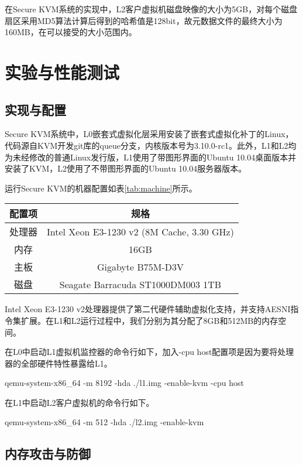 在Secure KVM系统的实现中，L2客户虚拟机磁盘映像的大小为5GB，对每个磁盘扇区采用MD5算法计算后得到的哈希值是128bit，故元数据文件的最终大小为160MB，在可以接受的大小范围内。

\section{实验与性能测试}

\subsection{实现与配置}

Secure KVM系统中，L0嵌套式虚拟化层采用安装了嵌套式虚拟化补丁的Linux，代码源自KVM开发git库的queue分支，内核版本号为3.10.0-rc1。此外，L1和L2均为未经修改的普通Linux发行版，L1使用了带图形界面的Ubuntu 10.04桌面版本并安装了KVM，L2使用了不带图形界面的Ubuntu 10.04服务器版本。

运行Secure KVM的机器配置如表\ref{tab:machine}所示。

\begin{table}[!htbp]
\centering
\begin{tabular}{cc}
\toprule
配置项	& 规格\\
\midrule
处理器	& Intel Xeon E3-1230 v2 (8M Cache, 3.30 GHz)\\
内存	& 16GB\\
主板	& Gigabyte B75M-D3V\\
磁盘  & Seagate Barracuda ST1000DM003 1TB\\
\bottomrule
\end{tabular}
\end{table}

Intel Xeon E3-1230 v2处理器提供了第二代硬件辅助虚拟化支持，并支持AESNI指令集扩展。在L1和L2运行过程中，我们分别为其分配了8GB和512MB的内存空间。

在L0中启动L1虚拟机监控器的命令行如下，加入-cpu host配置项是因为要将处理器的全部硬件特性暴露给L1。

qemu-system-x86\_64 -m 8192 -hda ./l1.img -enable-kvm -cpu host

在L1中启动L2客户虚拟机的命令行如下。

qemu-system-x86\_64 -m 512 -hda ./l2.img -enable-kvm

\subsection{内存攻击与防御}

